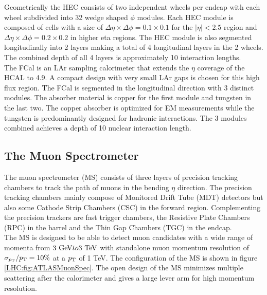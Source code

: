 \indent Geometrically the HEC consists of two independent wheels per endcap with each wheel subdivided into 32 wedge shaped $\phi$ modules.  Each HEC module is composed of cells with a size of $\Delta\eta \times \Delta\phi = 0.1 \times 0.1$ for the $|\eta|<2.5$ region and $\Delta\eta \times \Delta\phi = 0.2 \times 0.2$ in higher eta regions.  The HEC module is also segmented longitudinally into 2 layers making a total of 4 longitudinal layers in the 2 wheels. The combined depth of all 4 layers is approximately 10 interaction lengths. \\

\indent The FCal is an LAr sampling calorimeter that extends the $\eta$ coverage of the HCAL to 4.9.  A compact design with very small LAr gaps is chosen for this high flux region.  The FCal is segmented in the longitudinal direction with 3 distinct modules. The absorber material is copper for the first module and tungsten in the last two.  The copper absorber is optimized for EM measurements while the tungsten is predominantly designed for hadronic interactions.  The 3 modules combined achieves a depth of 10 nuclear interaction length. \\

\subsection{The Muon Spectrometer}
\label{LHC:MuonSpec}

\indent The muon spectrometer (MS) consists of three layers of precision tracking chambers to track the path of muons in the bending $\eta$ direction.  The precision tracking chambers mainly compose of Monitored Drift Tube (MDT) detectors but also some Cathode Strip Chambers (CSC) in the forward region.  Complementing the precision trackers are fast trigger chambers, the Resistive Plate Chambers (RPC) in the barrel and the Thin Gap Chambers (TGC) in the endcap. \\


\indent The MS is designed to be able to detect muon candidates with a wide range of momenta from $3 \gev to 3 \tev$ with standalone muon momentum resolution of $\sigma_{p_{\mathrm{T}}}/p_{\mathrm{T}} = 10\%$ at a $p_{\mathrm{T}}$ of 1 TeV.  The configuration of the MS is shown in figure \ref{LHC:fig:ATLASMuonSpec}.  The open design of the MS minimizes multiple scattering after the calorimeter and gives a large lever arm for high momentum resolution. ~\\

